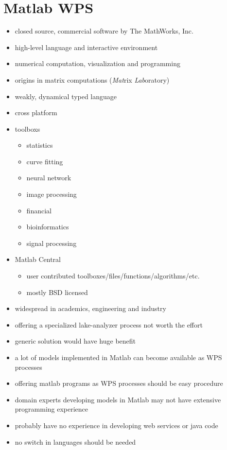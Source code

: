 \section{Matlab WPS}
	\begin{itemize}
		\item closed source, commercial software by The MathWorks, Inc.
		\item high-level language and interactive environment
		\item numerical computation, visualization and programming
		\item origins in matrix computations (\emph{Mat}rix \emph{Lab}oratory)
		\item weakly, dynamical typed language
		\item cross platform
		\item toolboxs
		\begin{itemize}
			\item statistics
			\item curve fitting
			\item neural network
			\item image processing
			\item financial
			\item bioinformatics
			\item signal processing
		\end{itemize}
		\item Matlab Central
		\begin{itemize}
			\item user contributed toolboxes/files/functions/algorithms/etc.
			\item mostly BSD licensed
		\end{itemize}
		\item widespread in academics, engineering and industry
		\item offering a specialized lake-analyzer process not worth the effort
		\item generic solution would have huge benefit
		\item a lot of models implemented in Matlab can become available as WPS processes
		\item offering matlab programs as WPS processes should be easy procedure
		\item domain experts developing models in Matlab may not have extensive programming experience
		\item probably have no experience in developing web services or java code
		\item no switch in languages should be needed

\end{itemize}
